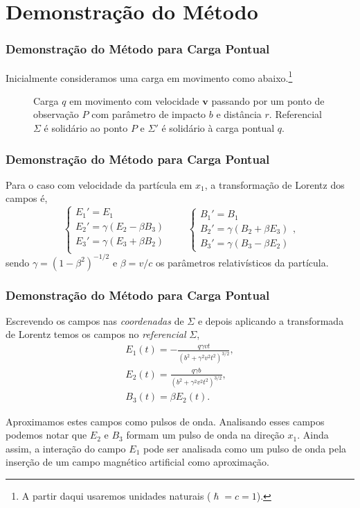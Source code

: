 \documentclass[xcolor=dvipsnames]{beamer}
\renewcommand{\vec}{\mathbf}
\begin{document}
\section{Demonstração do Método}

\begin{frame}
	\frametitle{Demonstração do Método para Carga Pontual}
	Inicialmente consideramos uma carga em movimento como abaixo.\footnote{A
	partir daqui usaremos unidades naturais ($\hslash = c = 1$).}
	\begin{figure}
	
	\caption{Carga $q$ em movimento com velocidade $\vec{v}$ passando por um
		ponto de observação $P$ com parâmetro de impacto $b$ e distância $r$.
		Referencial $\Sigma$ é solidário ao ponto $P$ e $\Sigma '$ é solidário
		à carga pontual $q$.}
	\end{figure}
\end{frame}

\begin{frame}
	\frametitle{Demonstração do Método para Carga Pontual}
	Para o caso com velocidade da partícula em $x_1$, a transformação de
	Lorentz dos campos é,
	\begin{equation}
		\label{eq_field_trans}
		\begin{cases}
		E_1' = E_1 \\
		E_2' = \gamma (E_2 - \beta B_3) \\
		E_3' = \gamma (E_3 + \beta B_2) \\
		\end{cases} \qquad
		\begin{cases}
		B_1 ' = B_1 \\
		B_2 ' = \gamma (B_2 + \beta E_3) \\
		B_3' = \gamma(B_3 - \beta E_2)
		\end{cases},
	\end{equation}
	sendo $\gamma = (1-\beta ^2)^{-1/2}$ e $\beta = v/c$ os parâmetros
	relativísticos da partícula.
\end{frame}

\begin{frame}
	\frametitle{Demonstração do Método para Carga Pontual}
	Escrevendo os campos nas \textit{coordenadas} de $\Sigma$ e depois
	aplicando a transformada de Lorentz temos os campos no \textit{referencial}
	$\Sigma$,
	\begin{gather}
		E_1 (t) = -\frac{q\gamma vt}{(b^2 + \gamma ^2 v^2t^2)^{3/2}}
			\label{eq_field1},\\
		E_2 (t) = \frac{q\gamma b}{(b^2 + \gamma ^2 v^2 t
			^2)^{3/2}}\label{eq_field2},\\ 
		B_3 (t) = \beta E_2(t) \label{eq_field3}.
	\end{gather}
	\begin{block}{Aproximamos estes campos como pulsos de onda.}
		Analisando esses campos podemos notar que $E_2$ e $B_3$ formam um pulso
		de onda na direção $x_1$. Ainda assim, a interação do campo $E_1$ pode
		ser analisada como um pulso de onda pela inserção de um campo magnético
		artificial como aproximação.
	\end{block}
\end{frame}
\end{document}
